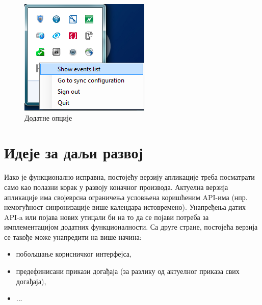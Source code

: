 \begin{figure}[H]
	\centering
	\includegraphics[scale=0.5]{slike/IconRightClick.png}
	\caption{Додатне опције}
	\label{fig:icon_right_click}
\end{figure}

\section{Идеје за даљи развој}

Иако је функционално исправна, постојећу верзију апликације треба посматрати само као полазни корак у развоју коначног производа. Актуелна верзија апликације има својеврсна ограничења условњена коришћеним API-има (нпр. немогућност синронизације више календара истовремено). Унапређења датих API-a или појава нових утицали би на то да се појави потреба за имплементацијом додатних функционалности. Са друге стране, постојећа верзија се такође може унапредити на више начина:
\begin{itemize}
	\item{побољшање корисничког интерфејса},
	\item{предефинисани прикази догађаја (за разлику од актуелног приказа свих догађаја)},
	\item{...}
\end{itemize}